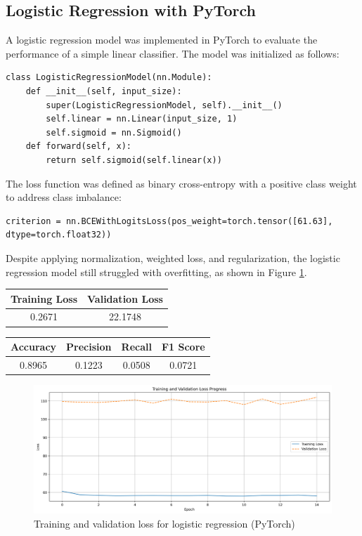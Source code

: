 \documentclass[conference,9pt]{IEEEtran}
\begin{document}
\subsection{Logistic Regression with PyTorch}
A logistic regression model was implemented in PyTorch to evaluate the performance of a simple linear classifier. The model was initialized as follows:
\begin{lstlisting}
class LogisticRegressionModel(nn.Module):
    def __init__(self, input_size):
        super(LogisticRegressionModel, self).__init__()
        self.linear = nn.Linear(input_size, 1)
        self.sigmoid = nn.Sigmoid()
    def forward(self, x):
        return self.sigmoid(self.linear(x))
\end{lstlisting}
The loss function was defined as binary cross-entropy with a positive class weight to address class imbalance:
\begin{lstlisting}
criterion = nn.BCEWithLogitsLoss(pos_weight=torch.tensor([61.63], dtype=torch.float32))
\end{lstlisting}
Despite applying normalization, weighted loss, and regularization, the logistic regression model still struggled with overfitting, as shown in Figure \ref{fig:logistic_torch}.
\begin{center}
    \begin{tabular}{c|c}
        Training Loss & Validation Loss \\ 
        \hline 
        0.2671 & 22.1748 \\
    \end{tabular}
\end{center}
\begin{center}
    \begin{tabular}{c|c|c|c}
        Accuracy & Precision & Recall & F1 Score \\ 
        \hline 
        0.8965 & 0.1223 &  0.0508 & 0.0721\\
    \end{tabular}
\end{center}
\begin{figure}[!t]
    \centering
    \includegraphics[width=\columnwidth]{../training_validation_loss_Iteration6.png}
    \caption{Training and validation loss for logistic regression (PyTorch)}
    \label{fig:logistic_torch}
\end{figure}
\end{document}

